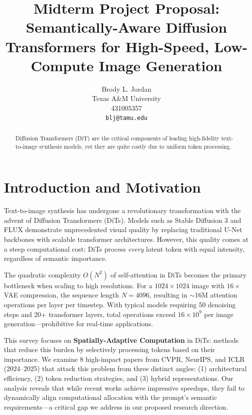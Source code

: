 \documentclass{article}
\title{Midterm Project Proposal: Semantically-Aware Diffusion Transformers for High-Speed, Low-Compute Image Generation}
\author{%
  Brody L. Jordan\\
  Texas A\&M University\\
  431005357\\
  \texttt{blj@tamu.edu} \\
}
\begin{document}
\maketitle


\begin{abstract}
    Diffusion Transformers (DiT) are the critical components of leading high-fidelity text-to-image synthesis models, yet they are quite costly due to uniform token processing.
\end{abstract}

\section{Introduction and Motivation}

Text-to-image synthesis has undergone a revolutionary transformation with the advent of
Diffusion Transformers (DiTs). Models such as Stable Diffusion 3 \cite{esser2024scaling}
and FLUX \cite{labs2024flux} demonstrate unprecedented visual quality by replacing
traditional U-Net backbones with scalable transformer architectures. However, this
quality comes at a steep computational cost: DiTs process \textit{every} latent token
with equal intensity, regardless of semantic importance.

The quadratic complexity $O(N^2)$ of self-attention in DiTs becomes the primary
bottleneck when scaling to high resolutions. For a $1024 \times 1024$ image with
$16\times$ VAE compression, the sequence length $N = 4096$, resulting in $\sim$16M
attention operations per layer per timestep. With typical models requiring 50
denoising steps and 20+ transformer layers, total operations exceed $16 \times 10^9$
per image generation—prohibitive for real-time applications.

This survey focuses on \textbf{Spatially-Adaptive Computation} in DiTs: methods that
reduce this burden by selectively processing tokens based on their importance.
We examine 8 high-impact papers from CVPR, NeurIPS, and ICLR (2024--2025) that
attack this problem from three distinct angles: (1) architectural efficiency,
(2) token reduction strategies, and (3) hybrid representations. Our analysis
reveals that while recent works achieve impressive speedups, they fail to
dynamically align computational allocation with the prompt's semantic requirements—a
critical gap we address in our proposed research direction.

\end{document}
